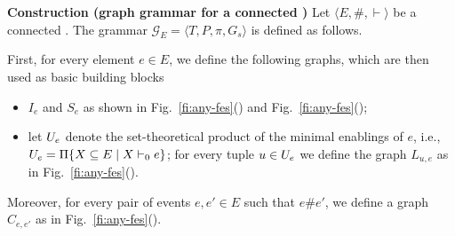 \smallskip

\noindent
\textbf{Construction (graph grammar for a connected {\esabbr})} 
%
Let $\langle E, \#, \vdash \rangle$ be a 
connected {\esabbr}. 
%
The grammar $\mathcal{G}_{E} = \langle T, P, \pi, G_s \rangle$ is
defined as follows. 

First, for every element $e \in E$, we define the following graphs, which are
then used as basic building blocks
\begin{itemize}
\item $I_e$ and $S_e$ as shown in Fig.~\ref{fi:any-fes}() and Fig.~\ref{fi:any-fes}();

\item let $U_{e}$ denote the set-theoretical product of the minimal enablings of
  $e$, i.e., $U_{e} = \Pi \{ X \subseteq E \mid X \vdash_0 e
  \}$; for every tuple $u \in U_{e}$ we define the graph $L_{u,e}$ as in
  Fig.~\ref{fi:any-fes}().
\end{itemize}
Moreover, for every pair of events $e, e' \in E$ such that $e \# e'$,
we define a graph $C_{e,e'}$ as in
Fig.~\ref{fi:any-fes}().

